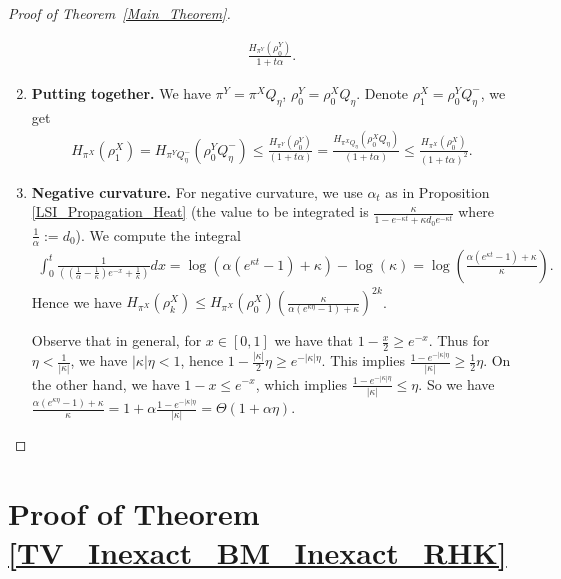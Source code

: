 \begin{proof}[Proof of Theorem~\ref{Main_Theorem}]
\begin{enumerate}
\begin{align*}
            \frac{H_{\pi^{Y} } (\rho_{0}^{Y} ) }{1 + t\alpha }.
        \end{align*}
        \item \textbf{Putting together.} 
        We have $\pi^{Y} = \pi^{X} Q_{\eta}$, $\rho_{0}^{Y} = \rho_{0}^{X} Q_{\eta}$. 
        Denote $\rho_{1}^{X} = \rho_{0}^{Y} Q_{\eta}^{-}$, we get 
        \begin{align*}
            H_{\pi^{X}} (\rho_{1}^{X} ) = 
            H_{\pi^{Y} Q_{\eta}^{-}} (\rho_{0}^{Y} Q_{\eta}^{-}) \le 
            \frac{H_{\pi^{Y} } (\rho_{0}^{Y} ) }{(1 + t\alpha) }
            = \frac{H_{\pi^{X} Q_{\eta} } (\rho_{0}^{X} Q_{\eta}) }{(1 + t\alpha) }
            \le 
            \frac{H_{\pi^{X}} (\rho_{0}^{X})}{(1 + t\alpha)^{2} }.
        \end{align*}
        \item \textbf{Negative curvature.} 
        For negative curvature, we use 
        $\alpha_{t}$ as in Proposition \ref{LSI_Propagation_Heat}
        (the value to be integrated is $\frac{\kappa}{1-e^{-\kappa t} + \kappa d_0 e^{-\kappa t}}$
        where $\frac{1}{\alpha} := d_{0}$). We compute the integral
        \begin{align*}
            \int_{0}^{t} \frac{1}{((\frac{1}{\alpha} -\frac{1}{\kappa})e^{-x} + \frac{1}{\kappa})} dx 
            = \log (\alpha(e^{\kappa t} - 1) + \kappa) - \log (\kappa)
            = \log (\frac{\alpha(e^{\kappa t} - 1) + \kappa}{\kappa}).
        \end{align*}
        Hence we have $ H_{\pi^{X}} (\rho_{k}^{X} ) \le H_{\pi^{X}} (\rho_{0}^{X}) (\frac{\kappa}{\alpha(e^{\kappa \eta} - 1) + \kappa})^{2k}$.
        
        Observe that in general, for $x \in [0, 1]$ we have that $1 - \frac{x}{2} \ge e^{-x}$.
        Thus for $\eta < \frac{1}{|\kappa|}$, we have $|\kappa| \eta < 1$, hence $1 -  \frac{|\kappa|}{2}\eta \ge e^{-|\kappa| \eta}$.
        This implies $\frac{1 - e^{-|\kappa| \eta}}{|\kappa|} \ge \frac{1}{2}\eta$.
        On the other hand, we have $1 - x \le e^{-x}$, which implies $\frac{1 - e^{-|\kappa| \eta}}{|\kappa|} \le \eta$.
        So we have $\frac{\alpha(e^{\kappa \eta} - 1) + \kappa}{\kappa} = 1 + \alpha\frac{1 - e^{-|\kappa| \eta}}{|\kappa|} = \Theta(1 + \alpha \eta)$.
    \end{enumerate}

    
\end{proof}

\section{Proof of Theorem \ref{TV_Inexact_BM_Inexact_RHK}}\label{Sec_Proof_Inexact_Theorem}

